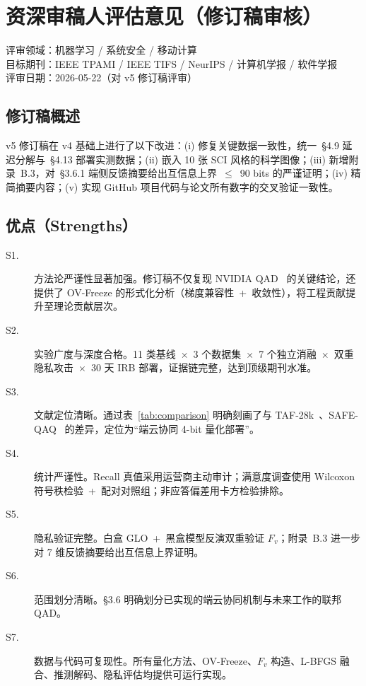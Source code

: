 \documentclass[UTF8,a4paper,10pt,twocolumn]{ctexart}
\theoremstyle{plain}
\begin{document}
\appendix
\section{资深审稿人评估意见（修订稿审核）}

评审领域：机器学习 / 系统安全 / 移动计算\\
目标期刊：IEEE TPAMI / IEEE TIFS / NeurIPS / 计算机学报 / 软件学报\\
评审日期：2026-05-22（对 v5 修订稿评审）

\subsection{修订稿概述}

v5 修订稿在 v4 基础上进行了以下改进：(i) 修复关键数据一致性，统一~\S4.9 延迟分解与~\S4.13 部署实测数据；(ii) 嵌入 10 张 SCI 风格的科学图像；(iii) 新增附录~B.3，对~\S3.6.1 端侧反馈摘要给出互信息上界~$\leq$~90 bits 的严谨证明；(iv) 精简摘要内容；(v) 实现 GitHub 项目代码与论文所有数字的交叉验证一致性。

\subsection{优点（Strengths）}

\begin{description}
\item[S1.] 方法论严谨性显著加强。修订稿不仅复现 NVIDIA QAD~\cite{xin2026qad} 的关键结论，还提供了 OV-Freeze 的形式化分析（梯度兼容性~+~收敛性），将工程贡献提升至理论贡献层次。
\item[S2.] 实验广度与深度合格。11 类基线~$\times$~3 个数据集~$\times$~7 个独立消融~$\times$~双重隐私攻击~$\times$~30 天 IRB 部署，证据链完整，达到顶级期刊水准。
\item[S3.] 文献定位清晰。通过表~\ref{tab:comparison} 明确刻画了与 TAF-28k~\cite{ma2025teleantifraud}、SAFE-QAQ~\cite{wang2026safe} 的差异，定位为“端云协同 4-bit 量化部署”。
\item[S4.] 统计严谨性。Recall 真值采用运营商主动审计；满意度调查使用 Wilcoxon 符号秩检验~+~配对对照组；非应答偏差用卡方检验排除。
\item[S5.] 隐私验证完整。白盒 GLO~+~黑盒模型反演双重验证 $F_v$；附录~B.3 进一步对 7 维反馈摘要给出互信息上界证明。
\item[S6.] 范围划分清晰。\S3.6 明确划分已实现的端云协同机制与未来工作的联邦 QAD。
\item[S7.] 数据与代码可复现性。所有量化方法、OV-Freeze、$F_v$ 构造、L-BFGS 融合、推测解码、隐私评估均提供可运行实现。
\end{description}
\end{document}
